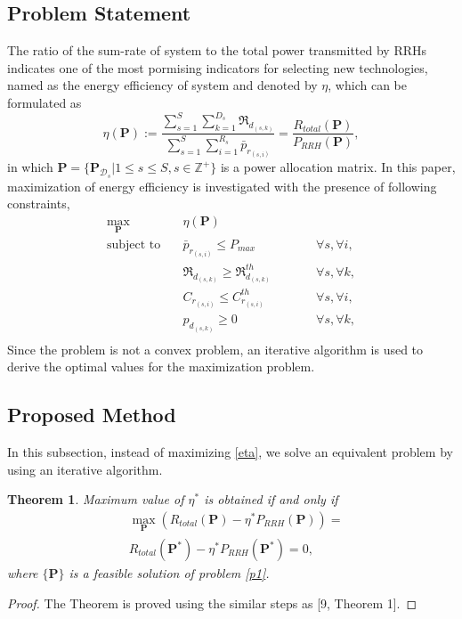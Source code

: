 \documentclass[conference,10pt,twocolumn,letter]{IEEEtran}
\newtheorem{theorem}{Theorem}
\begin{document}
\subsection{Problem Statement}
The ratio of the sum-rate of system to the total power transmitted by RRHs indicates one of the most pormising indicators for selecting new technologies, named as the energy efficiency of system and denoted by $\eta$, which can be formulated as
\begin{equation}\label{eta}
\eta(\boldsymbol{P}) := \frac{\sum\limits_{s=1}^{S} \sum\limits_{k=1}^{{D}_s}\mathfrak{R}_{d_{(s,k)}} }{\sum\limits_{s=1}^{S} \sum\limits_{i=1}^{{R}_s}\bar{p}_{r_{(s,i)}}} = \frac{R_{total}(\boldsymbol{P})}{P_{RRH}(\boldsymbol{P})},
\end{equation}
in which $ \boldsymbol{P} = \{ \boldsymbol{P}_{\mathcal{D}_s}|  1 \leq s \leq S, s \in \mathbb{Z}^{+} \}$ is a power allocation matrix.
In this paper, maximization of energy efficiency is investigated with the presence of following constraints, 
\begin{equation}\label{p1}
\begin{aligned}
\max\limits_{\boldsymbol{P}}   \quad &   \eta(\boldsymbol{P})\\
\text{subject to} \quad  & \bar{p}_{r_{(s,i)}} \leq P_{max} && \qquad \forall s, \forall i,   \\
&\mathfrak{R}_{d_{(s,k)}} \geq  \mathfrak{R}_{d_{(s,k)}}^{th} && \qquad \forall s, \forall k, \\
&C_{r_{(s,i)}} \leq C_{r_{(s,i)}}^{th}  &&\qquad \forall s, \forall i, \\
&p_{d_{(s,k)}}  \geq 0                                  &&\qquad \forall s, \forall k, \\
\end{aligned}			
\end{equation}
Since the problem is not a convex problem, an iterative algorithm is used to derive the optimal values for the maximization problem. 
\subsection{Proposed Method}
In this subsection, instead of maximizing \eqref{eta}, we solve an equivalent problem by using an iterative algorithm. 
\begin{theorem}\label{t2}
Maximum value of $\eta^*$ is obtained if and only if 
\begin{equation}\label{q2}
\begin{split}
&\max \limits_{\boldsymbol{P}} (R_{total}(\boldsymbol{P}) - \eta^* P_{RRH}(\boldsymbol{P}))=\\
& R_{total}(\boldsymbol{P}^*) - \eta^* P_{RRH}(\boldsymbol{P}^*) =0,
\end{split}
\end{equation}
where $\{\boldsymbol{P}\}$ is a feasible solution of problem \eqref{p1}.
\end{theorem}
\begin{proof}
The Theorem is proved using the similar steps as [9, Theorem 1].
\end{proof}
\end{document}

